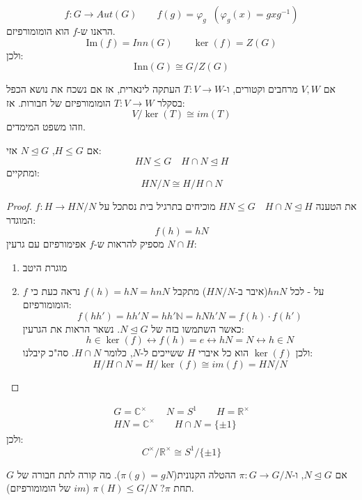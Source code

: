 \documentclass{tstextbook}
\begin{document}
\begin{example}
$$f:G\to Aut(G)\qquad f(g)=\varphi_{g}\;\;\left( \varphi_{g}(x)=gxg^{-1}  \right)$$
הראנו ש-\(f\) הוא הומומורפיזם.
$$\mathrm{Im}(f)=Inn(G)\qquad \ker(f)=Z(G)$$
ולכן:
$$\mathrm{Inn}(G) \cong G/ Z(G)$$

\end{example}
\begin{example}
אם \(V,W\) מרחבים וקטורים, ו-\(T:V\to W\) העתקה לינארית, אז אם נשכח את נושא הכפל בסקלר \(T:V\to W\) הומומורפיזם של חבורות. אז:
$$V/ \ker(T) \cong im(T)$$
וזהו משפט המימדים.

\end{example}
\begin{theorem}
אם \(H\leq G\), \(N\trianglelefteq G\) אזי:
$$HN\leq G \quad H\cap N\trianglelefteq H$$
ומתקיים:
$$HN/ N \cong H / H\cap N$$

\end{theorem}
\begin{proof}
את הטענה \(HN\leq G \quad H\cap N\trianglelefteq H\) מוכיחים בתרגיל בית נסתכל על \(f:H\to HN/N\) המוגדר: $$f(h)=hN$$ מספיק להראות ש-\(f\) אפימורפיזם עם גרעין \(N\cap H\):

  \begin{enumerate}
    \item מוגרת היטב 


    \item על - לכל \(hnN\)(איבר ב-\(HN / N\)) מתקבל \(f(h)=hN=hnN\) 
נראה כעת כי \(f\) הומומורפיזם:
$$f(hh')=hh'N=hh'\mathbb{N} =hNh'N=f(h)\cdot f(h')$$
כאשר השתמשו בזה של \(N\trianglelefteq G\). נשאר הראות את הגרעין:
$$h \in \ker(f) \leftrightarrow f(h)=e\leftrightarrow hN=N\leftrightarrow h \in N$$
ולכן \(\ker(f)\) הוא כל איברי \(H\) ששייכים ל-\(N\), כלומר \(H\cap N\). סה"כ קיבלנו: 
$$H / H\cap N = H / \ker(f) \cong im(f) = HN/ N$$


  \end{enumerate}
\end{proof}
\begin{example}
$$\begin{gathered}G=\mathbb{C}^\times \qquad  N=S^1\qquad H=\mathbb{R}^\times \\ HN=\mathbb{C} ^\times \qquad H\cap N=\{ \pm 1 \}
\end{gathered}$$
ולכן:
$$C^\times / \mathbb{R} ^\times  \cong S^1/\{ \pm 1 \}$$

\end{example}
אם \(N\trianglelefteq G\), ו-\(\pi:G\to G/N\) ההטלה הקנונית(\(\pi(g)=gN\)). מה קורה לתת חבורה של \(G\) תחת \(\pi\)? \(\pi(H)\leq G/N\) (\(im\) של הומומורפיזם).
\end{document}
